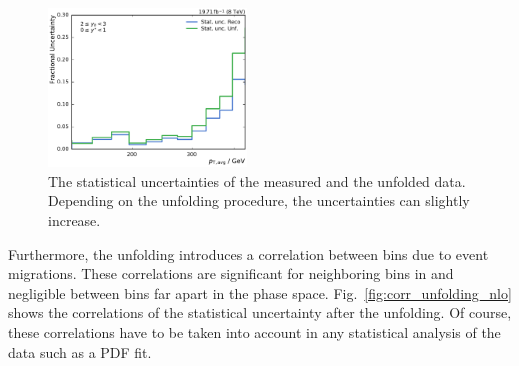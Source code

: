 \begin{figure}[htbp]
    \includegraphics[width=0.47\textwidth]{figures/measurement/statunc_fractional_yb2ys0.pdf}
    \caption[Statistical uncertainty of measured and unfolded spectrum]{The
    statistical uncertainties of the measured and the unfolded data. Depending
    on the unfolding procedure, the uncertainties can slightly increase.}
    \label{fig:statunc_relative}
\end{figure}

Furthermore, the unfolding introduces a correlation between bins due to event
migrations. These correlations are significant for neighboring bins in \pt and
negligible between bins far apart in the phase space.
Fig.~\ref{fig:corr_unfolding_nlo} shows the correlations of the statistical
uncertainty after the unfolding. Of course, these correlations have to be taken
into account in any statistical analysis of the data such as a PDF fit.


